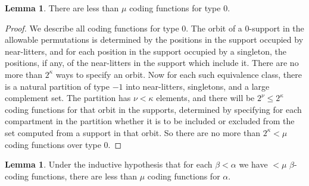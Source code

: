 \documentclass[112pt]{article}
\theoremstyle{definition}
\newtheorem{lemma}[theorem]{Lemma}
\theoremstyle{remark}
\newcommand{\rk}[1]{{\color{blue}\sl #1}}
\begin{document}
\begin{lemma}\label{lem:count_coding_function_zero}
{There are less than $\mu$ coding functions for type 0.}
\end{lemma}
\begin{proof}
We describe all coding functions for type 0.  The orbit of a 0-support in the allowable permutations is determined by the positions in the support  occupied by near-litters, and for each position in the support occupied by a singleton, the positions, if any, of the near-litters in the support  which include it.  %
  There are no more than $2^\kappa$ ways to specify an orbit.  Now for each such equivalence class, there is a natural partition of type $-1$ into near-litters, singletons, and a large complement set.  The partition has $\nu<\kappa$ elements, and there will be $2^\nu\leq 2^\kappa$ coding functions for that orbit in the supports, determined by specifying for each compartment in the partition whether it is to be included or excluded from the set computed from a support in that orbit.  So there are no more than $2^\kappa<\mu$ coding functions over type 0.
\end{proof}

\begin{lemma}\label{lem:count_coding_function}
{Under the inductive hypothesis that for each $\beta<\alpha$ we have $<\mu$ $\beta$-coding functions, there are less than $\mu$ coding functions for $\alpha$.}
\end{lemma}
\end{document}
